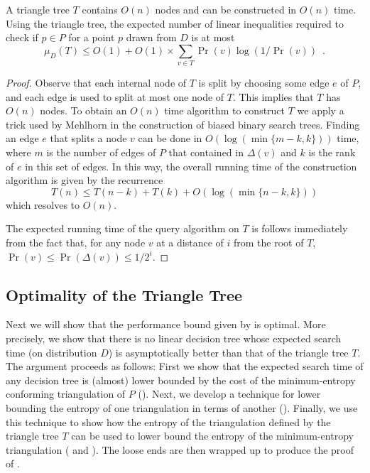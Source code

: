 \documentclass[charterfonts,lotsofwhite]{patmorin}
\begin{document}
\begin{lem}
A triangle tree $T$ contains $O(n)$ nodes and can be constructed in
$O(n)$ time.
Using the triangle tree, the expected number of linear inequalities
required to check if $p\in P$ for a point $p$ drawn from $D$ is at
most
\[
 \mu_D(T) 
   \le O(1)+O(1)\times \sum_{v\in T}\Pr(v)\log(1/\Pr(v)) \enspace .
\]
\end{lem}

\begin{proof}
Observe that each internal node of $T$ is split by choosing some edge
$e$ of $P$, and each edge is used to split at most one node of $T$.
This implies that $T$ has $O(n)$ nodes.
To obtain an $O(n)$ time algorithm to construct $T$ we apply a trick
used by Mehlhorn \cite{m75} in the construction of biased binary
search trees.  Finding an edge $e$ that splits a node $v$ can be done
in $O(\log (\min\{m-k,k\}))$ time, where $m$ is the number of edges of $P$ that
contained in $\Delta(v)$ and $k$ is the rank of $e$ in this set of
edges.  In this way, the overall running time of the
construction algorithm is given by the recurrence
\[
    T(n) \le T(n-k) + T(k) + O(\log(\min\{n-k,k\}))
\]
which resolves to $O(n)$.

The expected running time of the query algorithm on $T$ is follows
immediately from the fact that, for any node $v$ at a distance of $i$
from the root of $T$, $\Pr(v) \le \Pr(\Delta(v)) \le 1/2^i$.
\end{proof}


\subsection{Optimality of the Triangle Tree}

Next we will show that the performance bound given by
 is optimal.  More precisely, we show that there
is no linear decision tree whose expected search time (on distribution
$D$) is asymptotically better than that of the triangle tree $T$.  The
argument proceeds as follows:  First we show that the expected search
time of any decision tree is (almost) lower bounded by the cost of the
minimum-entropy conforming triangulation of $P$
().  Next, we develop a technique for lower
bounding the entropy of one triangulation in terms of another
().  Finally, we use this technique to show how the
entropy of the triangulation defined by the triangle tree $T$ can be
used to lower bound the entropy of the minimum-entropy triangulation
( and ). The loose ends are then
wrapped up to produce the proof of .
\end{document}
